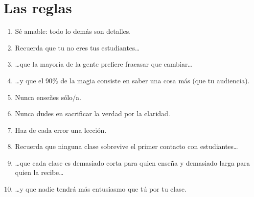 \chapter*{Las reglas}

\begin{enumerate}

\item Sé amable: todo lo demás son detalles.\\

\item Recuerda que tu no eres tus estudiantes{\ldots}\\

\item {\ldots}que la mayoría de la gente prefiere fracasar que cambiar{\ldots}\\

\item {\ldots}y que el 90\% de la magia consiste en saber una cosa más (que tu audiencia).\\

\item Nunca enseñes sólo/a.\\

\item Nunca dudes en sacrificar la verdad por la claridad.\\

\item Haz de cada error una lección.\\

\item Recuerda que ninguna clase sobrevive el primer contacto con estudiantes{\ldots}\\

\item {\ldots}que cada clase es demasiado corta para quien enseña y demasiado larga para quien la recibe{\ldots}\\

\item {\ldots}y que nadie tendrá más entusiasmo que tú por tu clase.

\end{enumerate}

